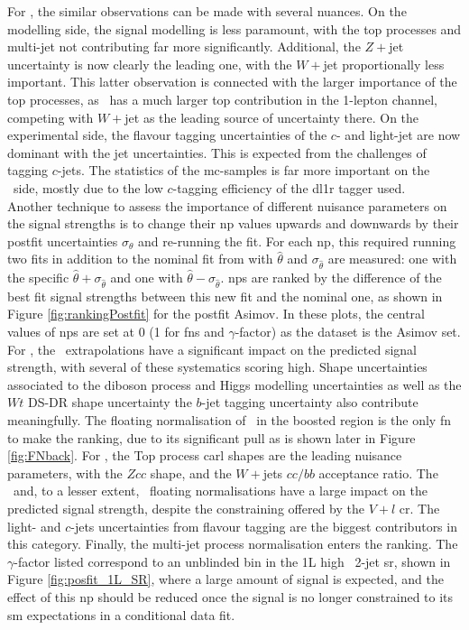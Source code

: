 For \vhc, the similar observations can be made with several nuances. On the modelling side, the signal modelling is less paramount, with the top processes and multi-jet not contributing far more significantly. Additional, the $Z+$jet uncertainty is now clearly the leading one, with the $W+$jet proportionally less important. This latter observation is connected with the larger importance of the top processes, as \vhc\ has a much larger top contribution in the 1-lepton channel, competing with $W+$jet as the leading source of uncertainty there. On the experimental side, the flavour tagging uncertainties of the $c$- and light-jet are now dominant with the jet uncertainties. This is expected from the challenges of tagging $c$-jets. The statistics of the \gls{mc}-samples is far more important on the \vhc\ side, mostly due to the low $c$-tagging efficiency of the \gls{dl1r} tagger used. \\

Another technique to assess the importance of different nuisance parameters on the signal strengths is to change their \gls{np} values upwards and downwards by their postfit uncertainties $\sigma_{\theta}$ and re-running the fit. For each \gls{np}, this required running two fits in addition to the nominal fit from with $\hat{\theta}$ and $\sigma_{\hat{\theta}}$ are measured: one with the specific $\hat{\theta} + \sigma_{\hat{\theta}}$ and one with $\hat{\theta} - \sigma_{\hat{\theta}}$. \gls{np}s are ranked by the difference of the best fit signal strengths between this new fit and the nominal one, as shown in Figure \ref{fig:rankingPostfit} for the postfit Asimov. In these plots, the central values of \gls{np}s are set at 0 (1 for \gls{fn}s and $\gamma$-factor) as the dataset is the Asimov set. For \vhb, the \whf\ extrapolations have a significant impact on the predicted signal strength, with several of these systematics scoring high. Shape uncertainties associated to the diboson process and Higgs modelling uncertainties as well as the $Wt$ DS-DR shape uncertainty the $b$-jet tagging uncertainty also contribute meaningfully. The floating normalisation of \whf\ in the boosted region is the only \gls{fn} to make the ranking, due to its significant pull as is shown later in Figure \ref{fig:FNback}. For \vhc, the Top process \gls{carl} shapes are the leading nuisance parameters, with the $Zcc$ shape, and the $W+$jets $cc/bb$ acceptance ratio. The \zlf\ and, to a lesser extent, \wlf\ floating normalisations have a large impact on the predicted signal strength, despite the constraining offered by the $V+l$ \gls{cr}. The light- and $c$-jets uncertainties from flavour tagging are the biggest contributors in this category. Finally, the multi-jet process normalisation enters the ranking. The $\gamma$-factor listed correspond to an unblinded bin in the 1L high \ptv\ 2-jet \gls{sr}, shown in Figure \ref{fig:posfit_1L_SR}, where a large amount of signal is expected, and the effect of this \gls{np} should be reduced once the signal is no longer constrained to its \gls{sm} expectations in a conditional data fit.


